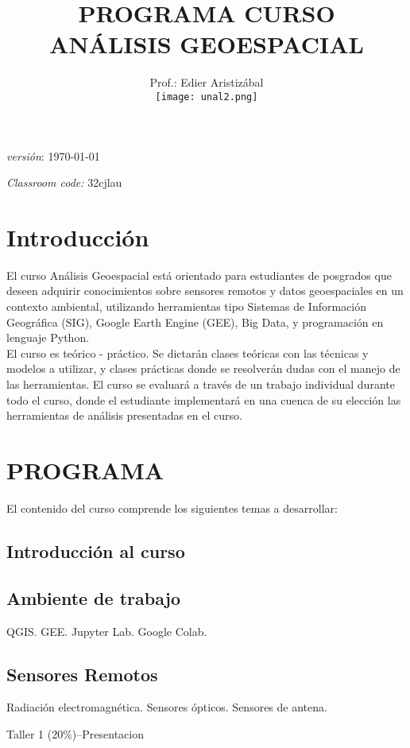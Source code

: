 \documentclass[a4paper,twoside,11pt,]{article}
\title {PROGRAMA  CURSO\\ ANÁLISIS GEOESPACIAL}
\author{Prof.: Edier Aristizábal\\[5ex]
\texttt{[image: unal2.png]}
}
\date{}
\begin{document}
\maketitle

\emph {versión}: \today

\emph {Classroom code:} 32cjlau

\section* {Introducción}
El curso Análisis Geoespacial está orientado para estudiantes de posgrados que deseen adquirir conocimientos sobre sensores remotos y datos geoespaciales en un contexto ambiental, utilizando herramientas tipo Sistemas de Información Geográfica (SIG), Google Earth Engine (GEE), Big Data, y programación en lenguaje Python.\\
El curso es teórico - práctico. Se dictarán clases teóricas con las técnicas y modelos a utilizar, y clases prácticas donde se resolverán dudas con el manejo de las herramientas. El curso se evaluará a través de un trabajo individual durante todo el curso, donde el estudiante implementará en una cuenca de su elección las herramientas de análisis presentadas en el curso.

\section{PROGRAMA}
El contenido del curso comprende los siguientes temas a desarrollar:\\

\subsection*{Introducción al curso}

\subsection {Ambiente de trabajo}
QGIS. GEE. Jupyter Lab. Google Colab.

\subsection {Sensores Remotos}
Radiación electromagnética. Sensores ópticos. Sensores de antena.

\begin{tcolorbox}[enhanced,width=5in,center upper,  fontupper=\large\bfseries,drop shadow southwest,sharp corners]
Taller 1 (20\%)--Presentacion 
\end{tcolorbox}
\end{document}
